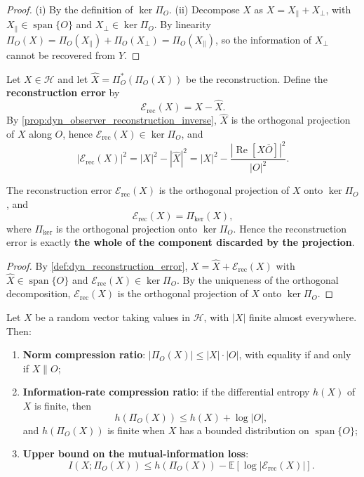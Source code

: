 \begin{proof}
(i) By the definition of $\ker\Pi_O$. (ii) Decompose $X$ as $X=X_\parallel+X_\perp$, with $X_\parallel\in\operatorname{span}\{O\}$ and $X_\perp\in\ker\Pi_O$. By linearity $\Pi_O(X)=\Pi_O(X_\parallel)+\Pi_O(X_\perp)=\Pi_O(X_\parallel)$, so the information of $X_\perp$ cannot be recovered from $Y$.
\end{proof}

\begin{definition}\label{def:dyn_reconstruction_error}
Let $X\in\mathcal H$ and let $\widehat X=\Pi_O^\ast(\Pi_O(X))$ be the reconstruction. Define the \textbf{reconstruction error} by
\[
\mathcal E_{\text{rec}}(X)=X-\widehat X.
\]
By \cref{prop:dyn_observer_reconstruction_inverse}, $\widehat X$ is the orthogonal projection of $X$ along $O$, hence $\mathcal E_{\text{rec}}(X)\in\ker\Pi_O$, and
\[
|\mathcal E_{\text{rec}}(X)|^2=|X|^2-|\widehat X|^2=|X|^2-\frac{|\operatorname{Re}[X\overline O]|^2}{|O|^2}.
\]
\end{definition}

\begin{proposition}\label{prop:dyn_reconstruction_error_geometry}
The reconstruction error $\mathcal E_{\text{rec}}(X)$ is the orthogonal projection of $X$ onto $\ker\Pi_O$, and
\[
\mathcal E_{\text{rec}}(X)=\Pi_{\ker}(X),
\]
where $\Pi_{\ker}$ is the orthogonal projection onto $\ker\Pi_O$. Hence the reconstruction error is exactly \textbf{the whole of the component discarded by the projection}.
\end{proposition}

\begin{proof}
By \cref{def:dyn_reconstruction_error}, $X=\widehat X+\mathcal E_{\text{rec}}(X)$ with $\widehat X\in\operatorname{span}\{O\}$ and $\mathcal E_{\text{rec}}(X)\in\ker\Pi_O$. By the uniqueness of the orthogonal decomposition, $\mathcal E_{\text{rec}}(X)$ is the orthogonal projection of $X$ onto $\ker\Pi_O$.
\end{proof}

\begin{theorem}\label{thm:dyn_information_compression_bound}
Let $X$ be a random vector taking values in $\mathcal H$, with $|X|$ finite almost everywhere. Then:
\begin{enumerate}[label=(\roman*)]
    \item \textbf{Norm compression ratio}: $|\Pi_O(X)|\le|X|\cdot|O|$, with equality if and only if $X\parallel O$;
    \item \textbf{Information-rate compression ratio}: if the differential entropy $h(X)$ of $X$ is finite, then
    \[
    h(\Pi_O(X))\le h(X)+\log|O|,
    \]
    and $h(\Pi_O(X))$ is finite when $X$ has a bounded distribution on $\operatorname{span}\{O\}$;
    \item \textbf{Upper bound on the mutual-information loss}:
    \[
    I(X;\Pi_O(X))\le h(\Pi_O(X))-\mathbb E[\log|\mathcal E_{\text{rec}}(X)|].
    \]
\end{enumerate}
\end{theorem}

